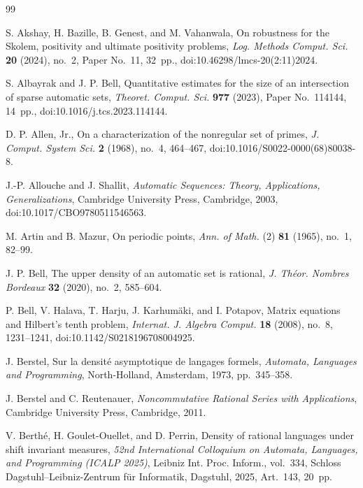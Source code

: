 \begin{thebibliography}{99}

S. Akshay, H. Bazille, B. Genest, and M. Vahanwala,
On robustness for the Skolem, positivity and ultimate positivity problems,
\textit{Log. Methods Comput. Sci.} \textbf{20} (2024), no.~2,
Paper No.~11, 32~pp.,
doi:10.46298/lmcs-20(2:11)2024.

S. Albayrak and J. P. Bell,
Quantitative estimates for the size of an intersection of sparse automatic sets,
\textit{Theoret. Comput. Sci.} \textbf{977} (2023), Paper No.~114144,
14~pp., doi:10.1016/j.tcs.2023.114144.

D. P. Allen, Jr.,
On a characterization of the nonregular set of primes,
\textit{J. Comput. System Sci.} \textbf{2} (1968), no.~4, 464--467,
doi:10.1016/S0022-0000(68)80038-8.

J.-P. Allouche and J. Shallit,
\textit{Automatic Sequences: Theory, Applications, Generalizations},
Cambridge University Press, Cambridge, 2003,
doi:10.1017/CBO9780511546563.

M. Artin and B. Mazur,
On periodic points,
\textit{Ann. of Math.} (2) \textbf{81} (1965), no.~1, 82--99.

J. P. Bell,
The upper density of an automatic set is rational,
\textit{J. Th{\'e}or. Nombres Bordeaux} \textbf{32} (2020), no.~2, 585--604.

P. Bell, V. Halava, T. Harju, J. Karhum\"aki, and I. Potapov,
Matrix equations and Hilbert's tenth problem,
\textit{Internat. J. Algebra Comput.} \textbf{18} (2008), no.~8,
1231--1241, doi:10.1142/S0218196708004925.

J. Berstel,
Sur la densit\'e asymptotique de langages formels,
\textit{Automata, Languages and Programming},
North-Holland, Amsterdam, 1973, pp.~345--358.

J. Berstel and C. Reutenauer,
\textit{Noncommutative Rational Series with Applications},
Cambridge University Press, Cambridge, 2011.

V. Berth{\'e}, H. Goulet-Ouellet, and D. Perrin,
Density of rational languages under shift invariant measures,
\textit{52nd International Colloquium on Automata, Languages, and Programming
(ICALP 2025)}, Leibniz Int. Proc. Inform., vol.~334,
Schloss Dagstuhl--Leibniz-Zentrum f\"ur Informatik, Dagstuhl, 2025,
Art.~143, 20~pp.


\end{thebibliography}
